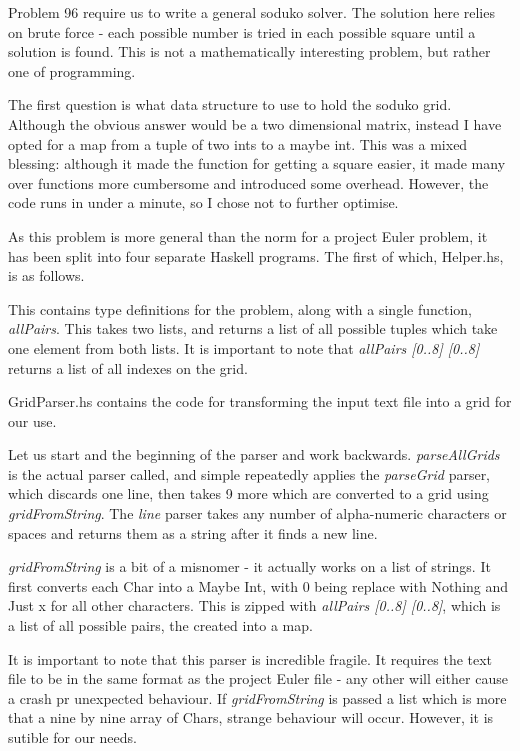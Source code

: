 Problem 96 require us to write a general soduko solver. The solution here relies on brute force - each possible number is tried in each possible square until a solution is found. This is not a mathematically interesting problem, but rather one of programming.

The first question is what data structure to use to hold the soduko grid. Although the obvious answer would be a two dimensional matrix, instead I have opted for a map from a tuple of two ints to a maybe int. This was a mixed blessing: although it made the function for getting a square easier, it made many over functions more cumbersome and introduced some overhead. However, the code runs in under a minute, so I chose not to further optimise.

As this problem is more general than the norm for a project Euler problem, it has been split into four separate Haskell programs. The first of which, Helper.hs, is as follows.



This contains type definitions for the problem, along with a single function, \textit{allPairs}. This takes two lists, and returns a list of all possible tuples which take one element from both lists. It is important to note that \textit{allPairs [0..8] [0..8]} returns a list of all indexes on the grid.

GridParser.hs contains the code for transforming the input text file into a grid for our use.



Let us start and the beginning of the parser and work backwards. \textit{parseAllGrids} is the actual parser called, and simple repeatedly applies the \textit{parseGrid} parser, which discards one line, then takes 9 more which are converted to a grid using \textit{gridFromString}. The \textit{line} parser takes any number of alpha-numeric characters or spaces and returns them as a string after it finds a new line.

\textit{gridFromString} is a bit of a misnomer - it actually works on a list of strings. It first converts each Char into a Maybe Int, with 0 being replace with Nothing and Just x for all other characters. This is zipped with \textit{allPairs [0..8] [0..8]}, which is a list of all possible pairs, the created into a map.

It is important to note that this parser is incredible fragile. It requires the text file to be in the same format as the project Euler file - any other will either cause a crash pr unexpected behaviour. If \textit{gridFromString} is passed a list which is more that a nine by nine array of Chars, strange behaviour will occur. However, it is sutible for our needs.


